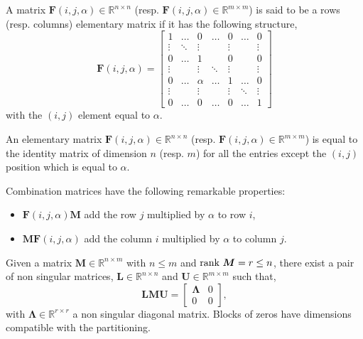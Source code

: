 		\begin{definition}
			A matrix $\bm{F}(i,j,\alpha)\in\mathbb{R}^{n\times n}$ (resp. $\bm{F}(i,j,\alpha)\in\mathbb{R}^{m\times m}$) is said to be a rows (resp. columns) elementary matrix if it has the following structure,
			\begin{equation}
				\bm{F}(i,j,\alpha) =
				\begin{bmatrix}
					1  		& 	\dots 	& 0 		& \dots 	& 0 		& \dots 	& 0 \\
					\vdots 	&	\ddots	& \vdots 	& 			& \vdots	& 			& \vdots \\
					0		& 	\dots	& 1			& 			& 0			& 			& 0 \\
					\vdots	& 			& \vdots 	& \ddots 	& \vdots 	& 			& \vdots \\ 	
					0		& \dots		& \alpha 	& \dots		& 1			& \dots		& 0 \\
					\vdots	& 			& \vdots	& 			& \vdots	& \ddots	& \vdots \\
					0 		& \dots		& 0			& \dots		& 0			& \dots 	& 1
				\end{bmatrix}
			\end{equation}
			with the $(i,j)$ element equal to $\alpha$.	
		\end{definition}
		\begin{remark}
			An elementary matrix $\bm{F}(i,j,\alpha)\in\mathbb{R}^{n\times n}$ (resp. $\bm{F}(i,j,\alpha)\in\mathbb{R}^{m\times m}$) is equal to the identity matrix of dimension $n$ (resp. $m$) for all the entries except the $(i,j)$ position which is equal to $\alpha$. 
		\end{remark}
		Combination matrices have the following remarkable properties:
		\begin{itemize}
			\item $\bm{F}(i,j,\alpha)\bm{M}$ add the row $j$ multiplied by $\alpha$ to row $i$,
			\item $\bm{MF}(i,j,\alpha)$ add the column $i$ multiplied by $\alpha$ to column $j$.
		\end{itemize}
		\begin{theorem}
			\label{th:gausssimply}
			Given a matrix $\bm{M}\in\mathbb{R}^{n\times m}$ with $n\leq m$ and $\textnormal{rank}~\bm{M} = r\leq n$, there exist a pair of non singular matrices, $\bm{L}\in\mathbb{R}^{n\times n}$ and $\bm{U}\in\mathbb{R}^{m\times m}$ such that,
			\begin{equation}
				\bm{LMU} = 
				\begin{bmatrix}
					\bm{\Lambda} & 0 \\
					0 		& 0
				\end{bmatrix},
			\end{equation}
			with $\bm{\Lambda}\in\mathbb{R}^{r\times r}$ a non singular diagonal  matrix. Blocks of zeros have dimensions compatible with the partitioning.
		\end{theorem}

